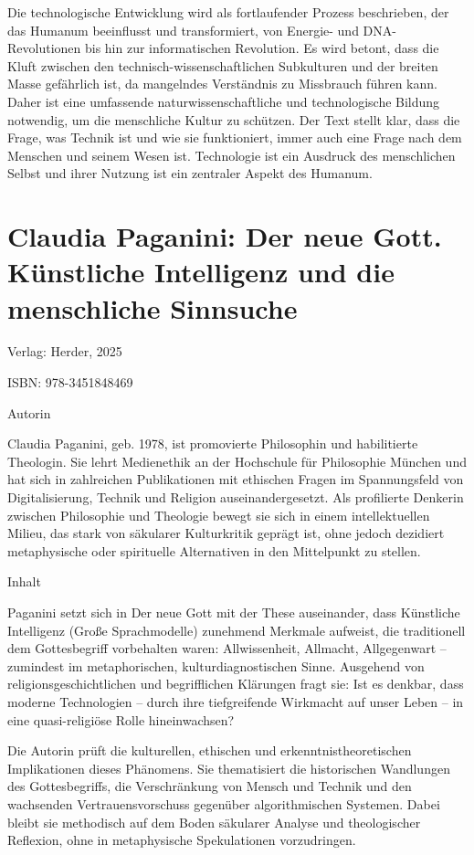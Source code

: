 \documentclass[
]{article}
\begin{document}
Die technologische Entwicklung wird als fortlaufender Prozess beschrieben, der das Humanum beeinflusst und transformiert, von Energie- und DNA-Revolutionen bis hin zur informatischen Revolution. Es wird betont, dass die Kluft zwischen den technisch-wissenschaftlichen Subkulturen und der breiten Masse gefährlich ist, da mangelndes Verständnis zu Missbrauch führen kann. Daher ist eine umfassende naturwissenschaftliche und technologische Bildung notwendig, um die menschliche Kultur zu schützen. Der Text stellt klar, dass die Frage, was Technik ist und wie sie funktioniert, immer auch eine Frage nach dem Menschen und seinem Wesen ist. Technologie ist ein Ausdruck des menschlichen Selbst und ihrer Nutzung ist ein zentraler Aspekt des Humanum.

\section{Claudia Paganini: Der neue Gott. Künstliche Intelligenz und die menschliche Sinnsuche}\label{claudia-paganini-der-neue-gott.-kuxfcnstliche-intelligenz-und-die-menschliche-sinnsuche}

Verlag: Herder, 2025

ISBN: 978-3451848469

Autorin

Claudia Paganini, geb. 1978, ist promovierte Philosophin und habilitierte Theologin. Sie lehrt Medienethik an der Hochschule für Philosophie München und hat sich in zahlreichen Publikationen mit ethischen Fragen im Spannungsfeld von Digitalisierung, Technik und Religion auseinandergesetzt. Als profilierte Denkerin zwischen Philosophie und Theologie bewegt sie sich in einem intellektuellen Milieu, das stark von säkularer Kulturkritik geprägt ist, ohne jedoch dezidiert metaphysische oder spirituelle Alternativen in den Mittelpunkt zu stellen.

Inhalt

Paganini setzt sich in Der neue Gott mit der These auseinander, dass Künstliche Intelligenz (Große Sprachmodelle) zunehmend Merkmale aufweist, die traditionell dem Gottesbegriff vorbehalten waren: Allwissenheit, Allmacht, Allgegenwart -- zumindest im metaphorischen, kulturdiagnostischen Sinne. Ausgehend von religionsgeschichtlichen und begrifflichen Klärungen fragt sie: Ist es denkbar, dass moderne Technologien -- durch ihre tiefgreifende Wirkmacht auf unser Leben -- in eine quasi-religiöse Rolle hineinwachsen?

Die Autorin prüft die kulturellen, ethischen und erkenntnistheoretischen Implikationen dieses Phänomens. Sie thematisiert die historischen Wandlungen des Gottesbegriffs, die Verschränkung von Mensch und Technik und den wachsenden Vertrauensvorschuss gegenüber algorithmischen Systemen. Dabei bleibt sie methodisch auf dem Boden säkularer Analyse und theologischer Reflexion, ohne in metaphysische Spekulationen vorzudringen.
\end{document}
